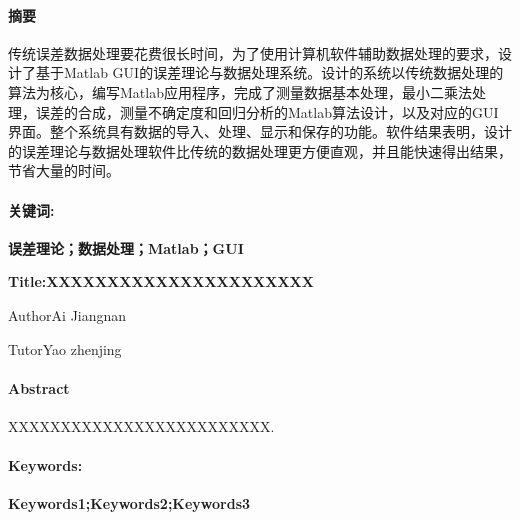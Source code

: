 \paragraph{摘要}{\kaishu {} 传统误差数据处理要花费很长时间，为了使用计算机软件辅助数据处理的要求，设计了基于Matlab GUI的误差理论与数据处理系统。设计的系统以传统数据处理的算法为核心，编写Matlab应用程序，完成了测量数据基本处理，最小二乘法处理，误差的合成，测量不确定度和回归分析的Matlab算法设计，以及对应的GUI界面。整个系统具有数据的导入、处理、显示和保存的功能。软件结果表明，设计的误差理论与数据处理软件比传统的数据处理更方便直观，并且能快速得出结果，节省大量的时间。}

\vspace{2em}
\paragraph{关键词:}\textbf{ 误差理论；数据处理；Matlab；GUI}
\newpage
\thispagestyle{empty}
\begin{center}
	\textbf{\heiti {} Title:XXXXXXXXXXXXXXXXXXXXXX}
	
	\vspace{1em}
	Author\quad Ai Jiangnan
	
	Tutor\quad Yao zhenjing
\end{center}
\vspace{2em}
\paragraph{Abstract}{ XXXXXXXXXXXXXXXXXXXXXXXXX.}
\vspace{2em}
\paragraph{Keywords:}\textbf{ Keywords1;Keywords2;Keywords3}
\newpage
{}
\begin{center}
	\tableofcontents
\end{center}
\thispagestyle{empty}